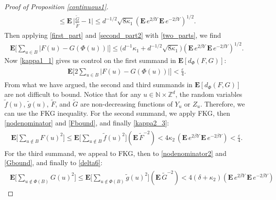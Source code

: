 \documentclass[11pt,reqno]{amsart}
\numberwithin{equation}{section}
\theoremstyle{definition}
\begin{document}
\begin{proof}[Proof of Proposition \ref{continuous1}]
{\begin{align}
\begin{split}
{\leq {\mathbf{E}}\, \bigg|\frac{{\widetilde{{G}}}}{{\widetilde{{F}}}}-1\bigg|
\leq d^{-1/2}\sqrt{8\kappa_1} ({\mathbf{E}}\, e^{2\beta Y}\, {\mathbf{E}}\, e^{-2\beta Y})^{1/2} \label{second_part2}.
} \end{split} \end{align}}
Then applying \eqref{first_part} and \eqref{second_part2} with \eqref{two_parts}, we find
{\begin{align*} {
{\mathbf{E}}\Bigg[\sum_{u \in B} |F(u) - G(\Phi(u))| \Bigg] \leq 
\big(d^{-1}\kappa_1 + d^{-1/2}\sqrt{8\kappa_1}\big)({\mathbf{E}}\, e^{2\beta Y}\, {\mathbf{E}}\, e^{-2\beta Y})^{1/2}.
} \end{align*}}
Now \eqref{kappa1_1} gives us control on the first summand in ${\mathbf{E}}[d_\Phi(F,G)]$:
{\begin{align} \begin{split} {
{\mathbf{E}}\Bigg[2\sum_{u \in B} |F(u) - G(\Phi(u))| \Bigg] < \frac{\varepsilon}{4} \label{final_bound_1}.
} \end{split} \end{align}}
From what we have argued, the second and third summands in ${\mathbf{E}}[d_\Phi(F,G)]$ are not difficult to bound.
Notice that for any $u \in {\mathbb{N}} \times {\mathbb{Z}}^d$, the random variables ${\widetilde{{f}}}(u)$, ${\widetilde{{g}}}(u)$, ${\widetilde{{F}}}$, and ${\widetilde{{G}}}$ are non-decreasing functions of $Y_u$ or $Z_u$. 
Therefore, we can use the FKG inequality.
For the second summand, we apply FKG, then \eqref{nodenominator} and \eqref{Fbound}, and finally \eqref{kappa2_3}:
{\begin{align} \begin{split} {
{\mathbf{E}}\bigg[\sum_{u \notin B} F(u)^{2}\bigg] \leq 
{\mathbf{E}}\bigg[\sum_{u \notin B} {\widetilde{{f}}}(u)^{2}\bigg] ({\mathbf{E}}\, {\widetilde{{F}}}^{-2}) 
< 4 \kappa_2\, ({\mathbf{E}}\, e^{2\beta Y}\, {\mathbf{E}}\, e^{-2\beta Y})
< \frac{\varepsilon}{4}. \label{final_bound_2}
} \end{split} \end{align}}
For the third summand, we appeal to FKG, then to \eqref{nodenominator2} and \eqref{Gbound}, and finally to \eqref{delta6}:
{\begin{align} \begin{split} {
{\mathbf{E}}\bigg[\sum_{u \notin \Phi(B)} G(u)^{2}\bigg] 
\leq {\mathbf{E}}\bigg[\sum_{u \notin \Phi(B)} {\widetilde{{g}}}(u)^{2}\bigg] ({\mathbf{E}}\, {\widetilde{{G}}}^{-2})
< 4(\delta + \kappa_2)({\mathbf{E}}\, e^{2\beta Y}\, {\mathbf{E}}\, e^{-2\beta Y})
}
\end{split}
\end{align}}
\end{proof}
\end{document}

